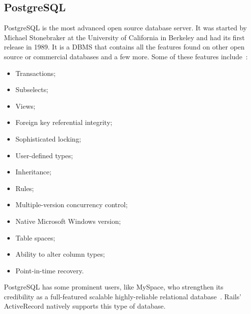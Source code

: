 \subsection{PostgreSQL}
PostgreSQL is the most advanced open source database server. It was started by Michael Stonebraker at the University of California in Berkeley and had its first release in 1989. It is a DBMS that contains all the features found on other open source or commercial databases and a few more. Some of these features include~\cite{beginning_postgresql}:
\begin{itemize}
  \item Transactions;
  \item Subselects;
  \item Views;
  \item Foreign key referential integrity;
  \item Sophisticated locking;
  \item User-defined types;
  \item Inheritance;
  \item Rules;
  \item Multiple-version concurrency control;
  \item Native Microsoft Windows version;
  \item Table spaces;
  \item Ability to alter column types;
  \item  Point-in-time recovery.
\end{itemize}
PostgreSQL has some prominent users, like MySpace, who strengthen its credibility as a full-featured scalable highly-reliable relational database~\cite{petabyte_warehouses}. Rails' ActiveRecord natively supports this type of database.


